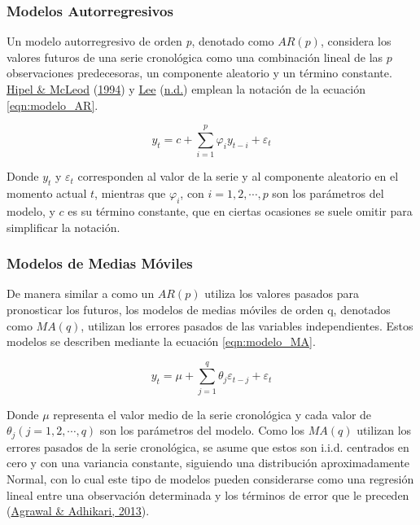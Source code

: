 \documentclass[
]{article}
\begin{document}
\subsubsection{Modelos Autorregresivos}

Un modelo autorregresivo de orden \emph{p}, denotado como \(AR(p)\),
considera los valores futuros de una serie cronológica como una
combinación lineal de las \(p\) observaciones predecesoras, un
componente aleatorio y un término constante.
\protect\hyperlink{ref-Hipel}{Hipel \& McLeod}
(\protect\hyperlink{ref-Hipel}{1994}) y \protect\hyperlink{ref-Lee}{Lee}
(\protect\hyperlink{ref-Lee}{n.d.}) emplean la notación de la ecuación
\ref{eqn:modelo_AR}.

\begin{equation}
\label{eqn:modelo_AR}
y_t=c+\sum_{i=1}^p \varphi_iy_{t-i}+\varepsilon_t
\end{equation}

Donde \(y_t\) y \(\varepsilon_t\) corresponden al valor de la serie y al
componente aleatorio en el momento actual \(t\), mientras que
\(\varphi_i\), con \(i=1,2,\cdots,p\) son los parámetros del modelo, y
\(c\) es su término constante, que en ciertas ocasiones se suele omitir
para simplificar la notación.

\subsubsection{Modelos de Medias Móviles}

De manera similar a como un \(AR(p)\) utiliza los valores pasados para
pronosticar los futuros, los modelos de medias móviles de orden q,
denotados como \(MA(q)\), utilizan los errores pasados de las variables
independientes. Estos modelos se describen mediante la ecuación
\ref{eqn:modelo_MA}.

\begin{equation}
\label{eqn:modelo_MA}
y_t=\mu+\sum_{j=1}^q \theta_j \varepsilon_{t-j}+\varepsilon_t
\end{equation}

Donde \(\mu\) representa el valor medio de la serie cronológica y cada
valor de \(\theta_j(j=1,2,\cdots,q)\) son los parámetros del modelo.
Como los \(MA(q)\) utilizan los errores pasados de la serie cronológica,
se asume que estos son i.i.d. centrados en cero y con una variancia
constante, siguiendo una distribución aproximadamente Normal, con lo
cual este tipo de modelos pueden considerarse como una regresión lineal
entre una observación determinada y los términos de error que le
preceden (\protect\hyperlink{ref-stationary_def}{Agrawal \& Adhikari,
2013}).
\end{document}
